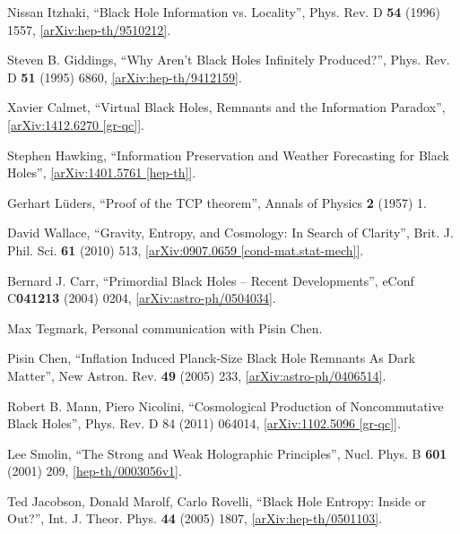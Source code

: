\documentclass[12pt]{article}
\newcommand{\2}{$^2$}
\newcommand{\3}{$^3$}
\newcommand{\4}{$_4$}
\newcommand{\5}{$_5$}
\begin{document}
\begin{thebibliography}{400}
Nissan Itzhaki, ``Black Hole Information vs. Locality'', 	Phys. Rev. D \textbf{54} (1996) 1557, \href{http://arxiv.org/abs/hep-th/9510212v2}{[arXiv:hep-th/9510212]}.

 Steven B. Giddings, ``Why Aren't Black Holes Infinitely Produced?'', 	Phys. Rev. D \textbf{51} (1995) 6860, \href{http://arxiv.org/abs/hep-th/9412159}{[arXiv:hep-th/9412159]}. 

 Xavier Calmet, ``Virtual Black Holes, Remnants and the Information Paradox'', \href{http://arxiv.org/abs/1412.6270}{[arXiv:1412.6270 [gr-qc]]}.

 Stephen Hawking, ``Information Preservation and Weather Forecasting for Black Holes'', \href{http://arxiv.org/abs/1401.5761}{[arXiv:1401.5761 [hep-th]]}.

 Gerhart L\"uders, ``Proof of the TCP theorem'', Annals of Physics \textbf{2} (1957) 1.

 David Wallace, ``Gravity, Entropy, and Cosmology: In Search of Clarity'', Brit. J. Phil. Sci. \textbf{61} (2010) 513, \href{http://arxiv.org/abs/0907.0659}{[arXiv:0907.0659 [cond-mat.stat-mech]]}.

Bernard J. Carr, ``Primordial Black Holes -- Recent Developments'', eConf C\textbf{041213} (2004) 0204, \href{http://arxiv.org/abs/astro-ph/0504034}{[arXiv:astro-ph/0504034]}. 

 Max Tegmark, Personal communication with Pisin Chen.

 Pisin Chen, ``Inflation Induced Planck-Size Black Hole Remnants As Dark Matter'', New Astron. Rev. \textbf{49} (2005) 233, \href{http://arxiv.org/abs/astro-ph/0406514}{[arXiv:astro-ph/0406514]}.

Robert B. Mann, Piero Nicolini, ``Cosmological Production of Noncommutative Black Holes'', Phys. Rev. D 84 (2011) 064014, \href{http://arxiv.org/abs/1102.5096}{[arXiv:1102.5096 [gr-qc]]}.

 Lee Smolin, ``The Strong and Weak Holographic Principles'', Nucl. Phys. B \textbf{601} (2001) 209, \href{http://arxiv.org/abs/hep-th/0003056}{[hep-th/0003056v1]}.

Ted Jacobson, Donald Marolf, Carlo Rovelli, ``Black Hole Entropy: Inside or Out?'', Int. J. Theor. Phys. \textbf{44} (2005) 1807, \href{http://arxiv.org/abs/hep-th/0501103}{[arXiv:hep-th/0501103]}.


\end{thebibliography}
\end{document}
